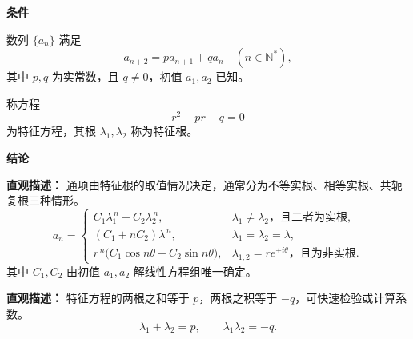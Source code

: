 \begin{statementbox}
	\textbf{\textcolor{CStatement}{条件}}
	\begin{description}[style=nextline, leftmargin=2.8em, labelsep=0.5em, itemsep=0.35em]
		\item[\textbf{\textcolor{CStatement}{条件1（递推关系）：}}]
		      数列 \(\{a_n\}\) 满足
		      \[
			      a_{n+2}=p a_{n+1}+q a_n\quad (n\in\mathbb N^*),
		      \]
		      其中 \(p,q\) 为实常数，且 \(q\neq0\)，初值 \(a_1,a_2\) 已知。
		\item[\textbf{\textcolor{CStatement}{条件2（特征方程）：}}]
		      称方程
		      \[
			      r^2-pr-q=0
		      \]
		      为特征方程，其根 \(\lambda_1,\lambda_2\) 称为特征根。
	\end{description}

	\textbf{\textcolor{CStatement}{结论}}
	\begin{description}[style=nextline, leftmargin=2.8em, labelsep=0.5em, itemsep=0.45em]
		\item[\textbf{\textcolor{CStatement}{结论一（通项公式）：}}]
		      \textbf{\textcolor{CStatement}{直观描述：}}
		      通项由特征根的取值情况决定，通常分为不等实根、相等实根、共轭复根三种情形。
		      \[
			      \boxed{
				      a_n=
				      \begin{cases}
					      C_1\lambda_1^{\,n}+C_2\lambda_2^{\,n},
					       & \lambda_1\neq\lambda_2\text{，且二者为实根},        \\[4pt]
					      (C_1+nC_2)\lambda^{\,n},
					       & \lambda_1=\lambda_2=\lambda,                 \\[4pt]
					      r^{\,n}\bigl(C_1\cos n\theta+C_2\sin n\theta\bigr),
					       & \lambda_{1,2}=re^{\pm i\theta}\text{，且为非实根}.
				      \end{cases}}
		      \]
		      其中 \(C_1,C_2\) 由初值 \(a_1,a_2\) 解线性方程组唯一确定。

		\item[\textbf{\textcolor{CStatement}{推广结论（根与系数关系）：}}]
		      \textbf{\textcolor{CStatement}{直观描述：}}
		      特征方程的两根之和等于 \(p\)，两根之积等于 \(-q\)，可快速检验或计算系数。
		      \[
			      \lambda_1+\lambda_2=p,
			      \qquad
			      \lambda_1\lambda_2=-q.
		      \]
	\end{description}
\end{statementbox}